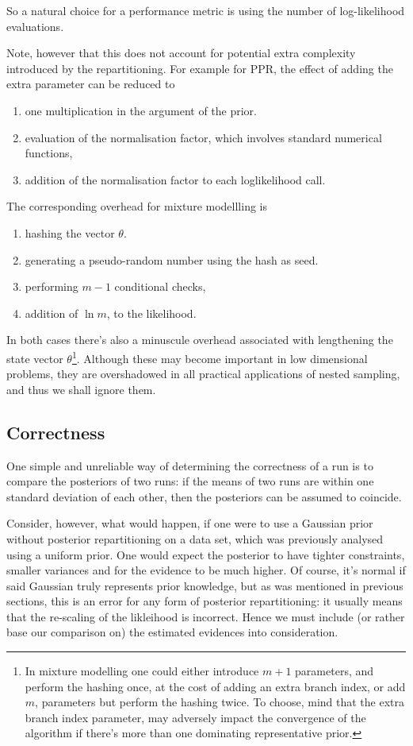 \documentclass[usenatbib]{mnras}
\begin{document}
So a natural choice for a performance metric is using the number of
log-likelihood evaluations. 

Note, however that this does not account for potential extra
complexity introduced by the repartitioning. For example for PPR,
the effect of adding the extra parameter can be reduced to
\begin{enumerate}
\item one multiplication in the argument of the prior.
\item evaluation of the normalisation factor, which involves standard
numerical functions,
\item addition of the normalisation factor to each loglikelihood call.
\end{enumerate}

The corresponding overhead for mixture modellling is
\begin{enumerate}
\item hashing the vector \(\theta\).
\item generating a pseudo-random number using the hash as seed.
\item performing \(m-1\) conditional checks,
\item addition of \(\ln m\), to the likelihood.
\end{enumerate}

In both cases there's also a minuscule overhead associated with
lengthening the state vector \(\theta\)\footnote{In mixture modelling one could either introduce \(m+1\) parameters, and perform the hashing once, at the cost of adding an extra branch index, or add \(m\), parameters but perform the hashing twice. To choose, mind that the extra branch index parameter, may adversely impact the convergence of the algorithm if there's more than one dominating representative prior.}.
Although these may become important in low dimensional problems,
they are overshadowed in all practical applications of nested
sampling, and thus we shall ignore them.

\subsection{Correctness}
\label{sec:orge2fac0a}
One simple and unreliable way of determining the correctness of a
run is to compare the posteriors of two runs: if the means of two
runs are within one standard deviation of each other, then the
posteriors can be assumed to coincide.

Consider, however, what would happen, if one were to use a Gaussian
prior without posterior repartitioning on a data set, which was
previously analysed using a uniform prior. One would expect the
posterior to have tighter constraints, smaller variances and for
the evidence to be much higher. Of course, it's normal if said
Gaussian truly represents prior knowledge, but as was mentioned in
previous sections, this is an error for any form of posterior
repartitioning: it usually means that the re-scaling of the
likleihood is incorrect. Hence we must include (or rather base our
comparison on) the estimated evidences into consideration.
\end{document}
